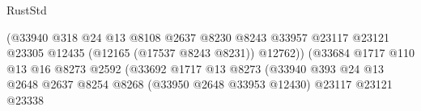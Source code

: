 \begin{lexlean}{RustStd}
\begin{coremodule}
                                                            (@33940
                                                              @318
                                                              @24
                                                              @13
                                                              @8108
                                                              @2637
                                                              @8230
                                                              @8243
                                                              @33957
                                                              @23117
                                                              @23121
                                                              @23305
                                                              @12435
                                                              (@12165 (@17537 @8243 @8231))
                                                              @12762))
                                                          (@33684
                                                            @1717
                                                            @110
                                                            @13
                                                            @16
                                                            @8273
                                                            @2592
                                                            (@33692
                                                              @1717
                                                              @13
                                                              @8273
                                                              (@33940
                                                                @393
                                                                @24
                                                                @13
                                                                @2648
                                                                @2637
                                                                @8254
                                                                @8268
                                                                (@33950 @2648 @33953 @12430)
                                                                @23117
                                                                @23121
                                                                @23338

\end{coremodule}
\end{lexlean}

